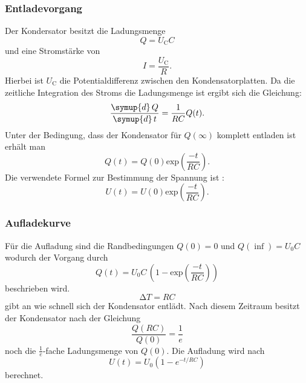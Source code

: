 \subsubsection{Entladevorgang}
Der Kondersator besitzt die Ladungsmenge
\begin{equation}
  Q = U_\text{C}C
  \label{eqn:2}
\end{equation}
und eine Stromstärke von
\begin{equation}
  I = \frac{U_\text{C}}{R}.
  \label{eqn:3}
\end{equation}
Hierbei ist $U_\text{C}$ die Potentialdifferenz zwischen den
Kondensatorplatten.
Da die zeitliche Integration des Stroms die Ladungsmenge ist ergibt sich die Gleichung:
\begin{equation}
  \frac{\symup{d}\,Q}{\symup{d}\, t} = \frac{1}{RC}Q(t).
  \label{eqn:4}
\end{equation}
Unter der Bedingung, dass der Kondensator für $Q(\infty)$ komplett entladen ist
erhält man
\begin{equation}
 Q(t) =  Q(0) \text{exp}\left(\frac{-t}{RC}\right).
\label{eqn:5}
\end{equation}
Die verwendete Formel zur Bestimmung der Spannung ist :
\begin{equation}
  U(t)=U(0)\text{exp}\left(\frac{-t}{RC}\right).
  \label{eqn:entladen}
\end{equation}

\subsubsection{Aufladekurve}
Für die Aufladung sind die Randbedingungen $Q(0) = 0$ und $Q(\inf) = U_0 C$ wodurch
der Vorgang durch
\begin{equation}
  Q(t) = U_0C\, \left(1 - \text{exp}\left(\frac{-t}{RC}\right)\right)
  \label{eqn:6}
\end{equation}
beschrieben wird.
\begin{equation}
  \increment T = RC
  \label{eqn:7}
\end{equation}
gibt an wie schnell sich der Kondensator entlädt. Nach diesem Zeitraum
besitzt der Kondensator nach der Gleichung
\begin{equation}
\frac{Q(RC)}{Q(0)} = \frac{1}{e}
\label{eqn:8}
\end{equation}
noch die $\frac{1}{e}$-fache Ladungsmenge von $Q(0)$.
Die Aufladung wird nach
\begin{equation}
  U(t)=U_0\left(1-e^{-t/RC}\right)
  \label{eqn:aufladen}
\end{equation}
berechnet.

